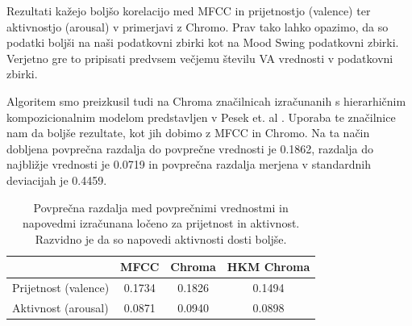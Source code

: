 \documentclass[a4paper, 12pt]{book}
\begin{document}
{\begin{table}[hbt]
\begin{center}
\begin{tabular}{| l | c | c |}
\end{tabular}
\label{regressionresults}
\end{center}
\end{table} 

Rezultati kažejo boljšo korelacijo med MFCC in prijetnostjo (valence) ter aktivnostjo (arousal) v primerjavi z Chromo. Prav tako lahko opazimo, da so podatki boljši na naši podatkovni zbirki kot na Mood Swing podatkovni zbirki. Verjetno gre to pripisati predvsem večjemu številu VA vrednosti v podatkovni zbirki. 

Algoritem smo preizkusil tudi na Chroma značilnicah izračunanih s hierarhičnim kompozicionalnim modelom predstavljen v Pesek et. al \cite{pesek2013chord}. Uporaba te značilnice nam da boljše rezultate, kot jih dobimo z MFCC in Chromo. Na ta način dobljena povprečna razdalja do povprečne vrednosti je 0.1862, razdalja do najbližje vrednosti je 0.0719 in povprečna razdalja merjena v standardnih deviacijah je 0.4459. 

\begin{table}[htb]
\begin{center}
\caption{Povprečna razdalja med povprečnimi vrednostmi in napovedmi izračunana ločeno za prijetnost in aktivnost. Razvidno je da so napovedi aktivnosti dosti boljše. }
\begin{tabular}{|l|c|c|c|}
\hline
 & MFCC & Chroma & HKM Chroma \\
\hline
Prijetnost (valence) & 0.1734 & 0.1826 & 0.1494\\
Aktivnost (arousal) & 0.0871 & 0.0940 & 0.0898\\
\hline
\end{tabular}
\label{seperateresults}
\end{center}
\end{table}

}
\end{document}

